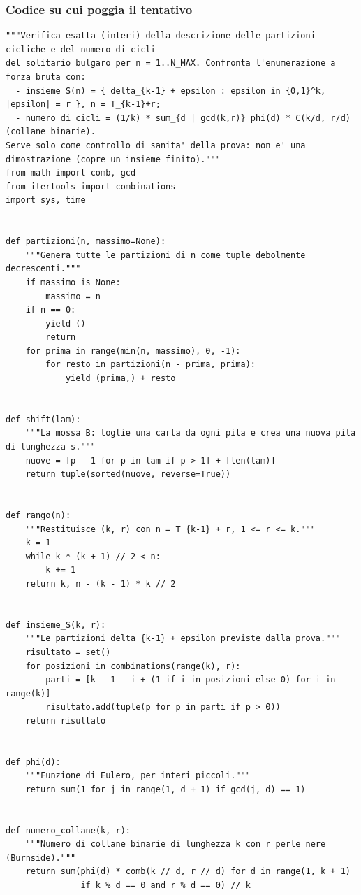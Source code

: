 \documentclass[11pt,a4paper]{article}
\begin{document}
\subsubsection{Codice su cui poggia il tentativo}
\begin{lstlisting}[caption={attempt\_001 code\_1 [python, rigore exact] — Sanity check (not part of the proof): exact brute-force enumeration of all partitions of n — verdetto del Referee: (nessun verdetto)}]
"""Verifica esatta (interi) della descrizione delle partizioni cicliche e del numero di cicli
del solitario bulgaro per n = 1..N_MAX. Confronta l'enumerazione a forza bruta con:
  - insieme S(n) = { delta_{k-1} + epsilon : epsilon in {0,1}^k, |epsilon| = r }, n = T_{k-1}+r;
  - numero di cicli = (1/k) * sum_{d | gcd(k,r)} phi(d) * C(k/d, r/d)  (collane binarie).
Serve solo come controllo di sanita' della prova: non e' una dimostrazione (copre un insieme finito)."""
from math import comb, gcd
from itertools import combinations
import sys, time


def partizioni(n, massimo=None):
    """Genera tutte le partizioni di n come tuple debolmente decrescenti."""
    if massimo is None:
        massimo = n
    if n == 0:
        yield ()
        return
    for prima in range(min(n, massimo), 0, -1):
        for resto in partizioni(n - prima, prima):
            yield (prima,) + resto


def shift(lam):
    """La mossa B: toglie una carta da ogni pila e crea una nuova pila di lunghezza s."""
    nuove = [p - 1 for p in lam if p > 1] + [len(lam)]
    return tuple(sorted(nuove, reverse=True))


def rango(n):
    """Restituisce (k, r) con n = T_{k-1} + r, 1 <= r <= k."""
    k = 1
    while k * (k + 1) // 2 < n:
        k += 1
    return k, n - (k - 1) * k // 2


def insieme_S(k, r):
    """Le partizioni delta_{k-1} + epsilon previste dalla prova."""
    risultato = set()
    for posizioni in combinations(range(k), r):
        parti = [k - 1 - i + (1 if i in posizioni else 0) for i in range(k)]
        risultato.add(tuple(p for p in parti if p > 0))
    return risultato


def phi(d):
    """Funzione di Eulero, per interi piccoli."""
    return sum(1 for j in range(1, d + 1) if gcd(j, d) == 1)


def numero_collane(k, r):
    """Numero di collane binarie di lunghezza k con r perle nere (Burnside)."""
    return sum(phi(d) * comb(k // d, r // d) for d in range(1, k + 1)
               if k % d == 0 and r % d == 0) // k



\end{lstlisting}
\end{document}
